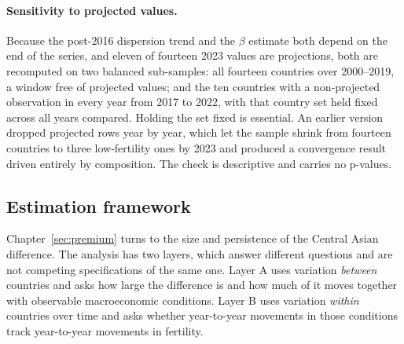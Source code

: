 \paragraph{Sensitivity to projected values.}
\label{sec:proj-check}
Because the post-2016 dispersion trend and the $\beta$ estimate both depend on the end of the series, and eleven of fourteen 2023 values are projections, both are recomputed on two balanced sub-samples: all fourteen countries over 2000--2019, a window free of projected values; and the ten countries with a non-projected observation in every year from 2017 to 2022, with that country set held fixed across all years compared. Holding the set fixed is essential. An earlier version dropped projected rows year by year, which let the sample shrink from fourteen countries to three low-fertility ones by 2023 and produced a convergence result driven entirely by composition. The check is descriptive and carries no p-values.

\subsection{Estimation framework}
\label{sec:estimation}

Chapter~\ref{sec:premium} turns to the size and persistence of the Central Asian difference. The analysis has two layers, which answer different questions and are not competing specifications of the same one. Layer A uses variation \emph{between} countries and asks how large the difference is and how much of it moves together with observable macroeconomic conditions. Layer B uses variation \emph{within} countries over time and asks whether year-to-year movements in those conditions track year-to-year movements in fertility.

